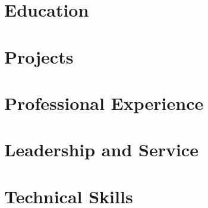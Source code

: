 \documentclass[letter,10pt]{article}
\begin{document}
\section{Education}


\section{Projects}


\section{Professional Experience}


\section{Leadership and Service}


\section{Technical Skills}

\end{document}
